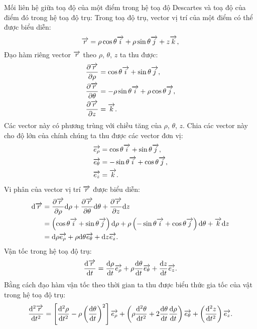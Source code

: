 \begin{appendices}
\begin{center}
    \end{center}
Mối liên hệ giữa toạ độ của một điểm trong hệ toạ độ Descartes và toạ độ của điểm đó trong hệ toạ độ trụ:
Trong toạ độ trụ, vector vị trí của một điểm có  thể được biểu diễn:
$$\overrightarrow{r}=\rho\cos{\theta}\overrightarrow{i}+\rho\sin{\theta}\overrightarrow{j}+z\overrightarrow{k},$$
Đạo hàm riêng vector $\overrightarrow{r}$ theo $\rho$, $\theta$, $z$ ta thu được:
\begin{align*}
    &\dfrac{\partial \overrightarrow{r}}{\partial \rho}= \cos{\theta}\overrightarrow{i}+\sin{\theta}\overrightarrow{j},\\
    &\dfrac{\partial \overrightarrow{r}}{\partial \theta}=-\rho\sin{\theta}\overrightarrow{i}+\rho\cos{\theta}\overrightarrow{j},\\
    &\dfrac{\partial \overrightarrow{r}}{\partial z}=\overrightarrow{k}.
\end{align*}
Các vector này có phương trùng với chiều tăng của $\rho$, $\theta$, $z$. Chia các vector này cho độ lớn của chính chúng ta thu được các vector đơn vị:
\begin{align*}
    &\overrightarrow{e_\rho}=\cos{\theta}\overrightarrow{i}+\sin{\theta}\overrightarrow{j},\\
    &\overrightarrow{e_\theta}=-\sin{\theta}\overrightarrow{i}+\cos{\theta}\overrightarrow{j},\\
    &\overrightarrow{e_z}=\overrightarrow{k}.
\end{align*}
Vi phân của vector vị trí $\overrightarrow{r}$ được biểu diễn:
\begin{align*}
    \mathrm{d}\overrightarrow{r}&=\dfrac{\partial \overrightarrow{r}}{\partial \rho}\mathrm{d} \rho+ \dfrac{\partial \overrightarrow{r}}{\partial \theta}\mathrm{d}\theta+
    \dfrac{\partial \overrightarrow{r}}{\partial z}\mathrm{d} z\\
    &=\left(\cos{\theta}\overrightarrow{i}+\sin{\theta}\overrightarrow{j}\right)\mathrm{d} \rho+\rho\left(-\sin{\theta}\overrightarrow{i}+\cos{\theta}\overrightarrow{j}\right)\mathrm{d}\theta+\overrightarrow{k}\mathrm{d} z\\
    &=\mathrm{d} \rho\overrightarrow{e_\rho}+\rho\mathrm{d}\theta\overrightarrow{e_\theta}+\mathrm{d} z\overrightarrow{e_z}.
\end{align*}
Vận tốc trong hệ toạ độ trụ:
\begin{align*}
    \dfrac{\mathrm{d} \overrightarrow{r}}{\mathrm{d} t}=\dfrac{\mathrm{d}\rho}{\mathrm{d} t}\overrightarrow{e_\rho}+\rho\dfrac{\mathrm{d}\theta}{\mathrm{d} t}\overrightarrow{e_\theta}+\dfrac{\mathrm{d} z}{\mathrm{d} t}\overrightarrow{e_z}.
    \end{align*}
Bằng cách đạo hàm vận tốc theo thời gian ta thu được biểu thức gia tốc của vật trong hệ toạ độ trụ:
\begin{align*}
    \dfrac{\mathrm{d}^2 \overrightarrow{r}}{\mathrm{d} t^2}=\left[\dfrac{\mathrm{d}^2\rho}{\mathrm{d} t^2}-\rho\left(\dfrac{\mathrm{d} \theta}{\mathrm{d} t}\right)^2\right]\overrightarrow{e_\rho}+\left(\rho\dfrac{\mathrm{d}^2\theta}{\mathrm{d} t^2}+2\dfrac{\mathrm{d} \theta}{\mathrm{d} t}\dfrac{\mathrm{d} \rho}{\mathrm{d} t}\right)\overrightarrow{e_\theta}+\left(\dfrac{\mathrm{d}^2z}{\mathrm{d} t^2}\right)\overrightarrow{e_z}.
\end{align*}

\end{appendices}
